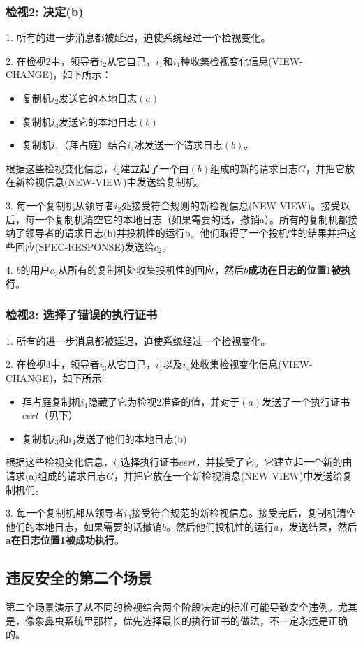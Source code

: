 \documentclass[UTF8]{ctexart}
\begin{document}
\subsubsection*{检视2: 决定(b)}
1. 所有的进一步消息都被延迟，迫使系统经过一个检视变化。

2. 在检视2中，领导者$i_2$从它自己，$i_1$和$i_4$种收集检视变化信息(VIEW-CHANGE)，如下所示：
\begin{itemize}
  \item 复制机$i_2$发送它的本地日志$(a)$
  \item 复制机$i_4$发送它的本地日志$(b)$
  \item 复制机$i_1$（拜占庭）结合$i_4$冰发送一个请求日志$(b)$。
\end{itemize}
根据这些检视变化信息，$i_2$建立起了一个由$(b)$组成的新的请求日志$G$，并把它放在新检视信息(NEW-VIEW)中发送给复制机。

3. 每一个复制机从领导者$i_2$处接受符合规则的新检视信息(NEW-VIEW)。接受以后，每一个复制机清空它的本地日志（如果需要的话，撤销a）。所有的复制机都接纳了领导者的请求日志(b)并投机性的运行b。他们取得了一个投机性的结果并把这些回应(SPEC-RESPONSE)发送给$c_2$。

4. $b$的用户$c_2$从所有的复制机处收集投机性的回应，然后\textbf{$b$成功在日志的位置$1$被执行}。

\subsubsection*{检视3: 选择了错误的执行证书}
1. 所有的进一步消息都被延迟，迫使系统经过一个检视变化。

2. 在检视3中，领导者$i_3$从它自己，$i_1$以及$i_4$处收集检视变化信息(VIEW-CHANGE)，如下所示:
\begin{itemize}
	\item 拜占庭复制机$i_1$隐藏了它为检视2准备的值，并对于$(a)$发送了一个执行证书$cert$（见下）
	\item 复制机$i_3$和$i_4$发送了他们的本地日志(b)
\end{itemize}
根据这些检视变化信息，$i_3$选择执行证书$cert$，并接受了它。它建立起一个新的由请求(a)组成的请求日志$G$，并把它放在一个新检视消息(NEW-VIEW)中发送给复制机们。

3. 每一个复制机都从领导者$i_3$接受符合规范的新检视信息。接受完后，复制机清空他们的本地日志，如果需要的话撤销$b$。然后他们投机性的运行$a$，发送结果，然后\textbf{a在日志位置1被成功执行}。

\subsection{违反安全的第二个场景}
第二个场景演示了从不同的检视结合两个阶段决定的标准可能导致安全违例。尤其是，像象鼻虫系统里那样，优先选择最长的执行证书的做法，不一定永远是正确的。
\end{document}
